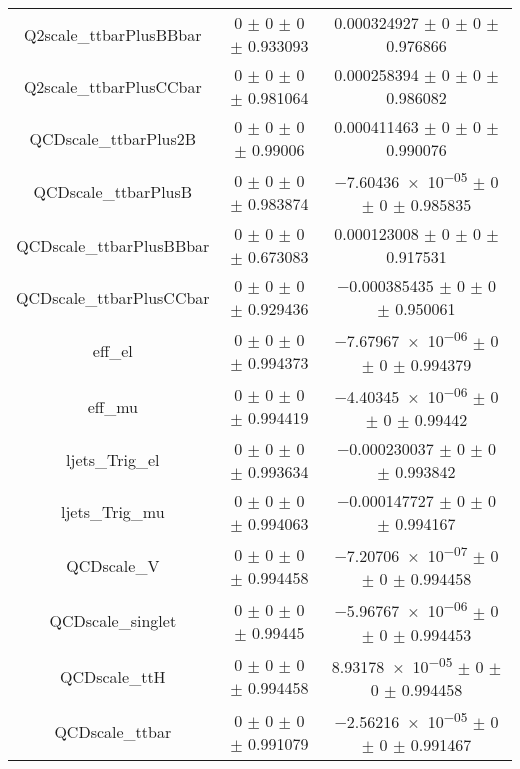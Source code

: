 \begin{table}
\begin{tabular}{ccc}
Q2scale\_ttbarPlusBBbar & \num{0} $\pm$ \num{0} $\pm$ \num{0} $\pm$ \num{0.933093} & \num{0.000324927} $\pm$ \num{0} $\pm$ \num{0} $\pm$ \num{0.976866}\\
Q2scale\_ttbarPlusCCbar & \num{0} $\pm$ \num{0} $\pm$ \num{0} $\pm$ \num{0.981064} & \num{0.000258394} $\pm$ \num{0} $\pm$ \num{0} $\pm$ \num{0.986082}\\
QCDscale\_ttbarPlus2B & \num{0} $\pm$ \num{0} $\pm$ \num{0} $\pm$ \num{0.99006} & \num{0.000411463} $\pm$ \num{0} $\pm$ \num{0} $\pm$ \num{0.990076}\\
QCDscale\_ttbarPlusB & \num{0} $\pm$ \num{0} $\pm$ \num{0} $\pm$ \num{0.983874} & \num{-7.60436e-05} $\pm$ \num{0} $\pm$ \num{0} $\pm$ \num{0.985835}\\
QCDscale\_ttbarPlusBBbar & \num{0} $\pm$ \num{0} $\pm$ \num{0} $\pm$ \num{0.673083} & \num{0.000123008} $\pm$ \num{0} $\pm$ \num{0} $\pm$ \num{0.917531}\\
QCDscale\_ttbarPlusCCbar & \num{0} $\pm$ \num{0} $\pm$ \num{0} $\pm$ \num{0.929436} & \num{-0.000385435} $\pm$ \num{0} $\pm$ \num{0} $\pm$ \num{0.950061}\\
eff\_el & \num{0} $\pm$ \num{0} $\pm$ \num{0} $\pm$ \num{0.994373} & \num{-7.67967e-06} $\pm$ \num{0} $\pm$ \num{0} $\pm$ \num{0.994379}\\
eff\_mu & \num{0} $\pm$ \num{0} $\pm$ \num{0} $\pm$ \num{0.994419} & \num{-4.40345e-06} $\pm$ \num{0} $\pm$ \num{0} $\pm$ \num{0.99442}\\
ljets\_Trig\_el & \num{0} $\pm$ \num{0} $\pm$ \num{0} $\pm$ \num{0.993634} & \num{-0.000230037} $\pm$ \num{0} $\pm$ \num{0} $\pm$ \num{0.993842}\\
ljets\_Trig\_mu & \num{0} $\pm$ \num{0} $\pm$ \num{0} $\pm$ \num{0.994063} & \num{-0.000147727} $\pm$ \num{0} $\pm$ \num{0} $\pm$ \num{0.994167}\\
QCDscale\_V & \num{0} $\pm$ \num{0} $\pm$ \num{0} $\pm$ \num{0.994458} & \num{-7.20706e-07} $\pm$ \num{0} $\pm$ \num{0} $\pm$ \num{0.994458}\\
QCDscale\_singlet & \num{0} $\pm$ \num{0} $\pm$ \num{0} $\pm$ \num{0.99445} & \num{-5.96767e-06} $\pm$ \num{0} $\pm$ \num{0} $\pm$ \num{0.994453}\\
QCDscale\_ttH & \num{0} $\pm$ \num{0} $\pm$ \num{0} $\pm$ \num{0.994458} & \num{8.93178e-05} $\pm$ \num{0} $\pm$ \num{0} $\pm$ \num{0.994458}\\
QCDscale\_ttbar & \num{0} $\pm$ \num{0} $\pm$ \num{0} $\pm$ \num{0.991079} & \num{-2.56216e-05} $\pm$ \num{0} $\pm$ \num{0} $\pm$ \num{0.991467}\\

\end{tabular}
\end{table}
